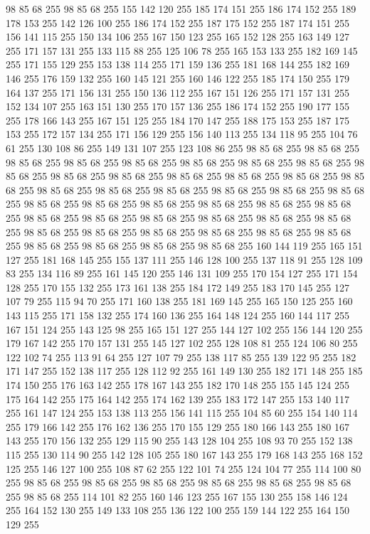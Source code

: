 98 85 68 255 98 85 68 255 155 142 120 255 185 174 151 255 186 174 152 255 189 178 153 255 142 126 100 255 186 174 152 255 187 175 152 255 187 174 151 255 156 141 115 255 150 134 106 255 167 150 123 255 165 152 128 255 163 149 127 255 171 157 131 255 133 115 88 255 125 106 78 255 165 153 133 255 182 169 145 255 171 155 129 255 153 138 114 255 171 159 136 255 181 168 144 255 182 169 146 255 176 159 132 255 160 145 121 255 160 146 122 255 185 174 150 255 179 164 137 255 171 156 131 255 150 136 112 255 167 151 126 255 171 157 131 255 152 134 107 255 163 151 130 255 170 157 136 255 186 174 152 255 190 177 155 255 178 166 143 255 167 151 125 255 184 170 147 255 188 175 153 255 187 175 153 255 172 157 134 255 171 156 129 255 156 140 113 255 134 118 95 255 104 76 61 255 130 108 86 255 149 131 107 255 123 108 86 255 98 85 68 255 98 85 68 255 98 85 68 255 98 85 68 255 98 85 68 255 98 85 68 255 98 85 68 255 98 85 68 255 98 85 68 255 98 85 68 255 98 85 68 255 98 85 68 255
98 85 68 255 98 85 68 255 98 85 68 255 98 85 68 255 98 85 68 255 98 85 68 255 98 85 68 255 98 85 68 255 98 85 68 255 98 85 68 255 98 85 68 255 98 85 68 255 98 85 68 255 98 85 68 255 98 85 68 255 98 85 68 255 98 85 68 255 98 85 68 255 98 85 68 255 98 85 68 255 98 85 68 255 98 85 68 255 98 85 68 255 98 85 68 255 98 85 68 255 98 85 68 255 98 85 68 255 98 85 68 255 98 85 68 255 98 85 68 255 98 85 68 255 160 144 119 255 165 151 127 255 181 168 145 255 155 137 111 255 146 128 100 255 137 118 91 255 128 109 83 255 134 116 89 255 161 145 120 255 146 131 109 255 170 154 127 255 171 154 128 255 170 155 132 255 173 161 138 255 184 172 149 255 183 170 145 255 127 107 79 255 115 94 70 255 171 160 138 255 181 169 145 255 165 150 125 255 160 143 115 255 171 158 132 255 174 160 136 255 164 148 124 255 160 144 117 255 167 151 124 255 143 125 98 255 165 151 127 255 144 127 102 255 156 144 120 255 179 167 142 255 170 157 131 255
145 127 102 255 128 108 81 255 124 106 80 255 122 102 74 255 113 91 64 255 127 107 79 255 138 117 85 255 139 122 95 255 182 171 147 255 152 138 117 255 128 112 92 255 161 149 130 255 182 171 148 255 185 174 150 255 176 163 142 255 178 167 143 255 182 170 148 255 155 145 124 255 175 164 142 255 175 164 142 255 174 162 139 255 183 172 147 255 153 140 117 255 161 147 124 255 153 138 113 255 156 141 115 255 104 85 60 255 154 140 114 255 179 166 142 255 176 162 136 255 170 155 129 255 180 166 143 255 180 167 143 255 170 156 132 255 129 115 90 255 143 128 104 255 108 93 70 255 152 138 115 255 130 114 90 255 142 128 105 255 180 167 143 255 179 168 143 255 168 152 125 255 146 127 100 255 108 87 62 255 122 101 74 255 124 104 77 255 114 100 80 255 98 85 68 255 98 85 68 255 98 85 68 255 98 85 68 255 98 85 68 255 98 85 68 255 98 85 68 255 114 101 82 255 160 146 123 255 167 155 130 255 158 146 124 255 164 152 130 255 149 133 108 255 136 122 100 255 159 144 122 255 164 150 129 255
